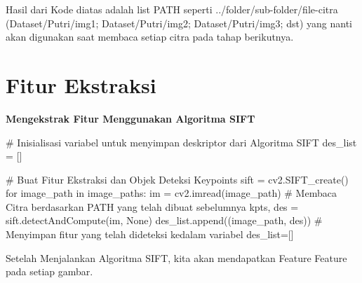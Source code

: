 \documentclass[
  letterpaper,
  DIV=11,
  numbers=noendperiod]{scrreprt}
\newenvironment{Shaded}{\begin{snugshade}}{\end{snugshade}}
\newcommand{\CommentTok}[1]{\textcolor[rgb]{0.37,0.37,0.37}{#1}}
\newcommand{\ControlFlowTok}[1]{\textcolor[rgb]{0.00,0.23,0.31}{#1}}
\newcommand{\KeywordTok}[1]{\textcolor[rgb]{0.00,0.23,0.31}{#1}}
\newcommand{\NormalTok}[1]{\textcolor[rgb]{0.00,0.23,0.31}{#1}}
\newcommand{\OperatorTok}[1]{\textcolor[rgb]{0.37,0.37,0.37}{#1}}
\newcommand{\VariableTok}[1]{\textcolor[rgb]{0.07,0.07,0.07}{#1}}
\begin{document}
\begin{tcolorbox}[enhanced jigsaw, opacityback=0, colbacktitle=quarto-callout-tip-color!10!white, breakable, titlerule=0mm, left=2mm, toptitle=1mm, rightrule=.15mm, leftrule=.75mm, colback=white, opacitybacktitle=0.6, arc=.35mm, toprule=.15mm, coltitle=black, colframe=quarto-callout-tip-color-frame, bottomtitle=1mm, title=\textcolor{quarto-callout-tip-color}{\faLightbulb}\hspace{0.5em}{Tip}, bottomrule=.15mm]

Hasil dari Kode diatas adalah list PATH seperti
../folder/sub-folder/file-citra (Dataset/Putri/img1; Dataset/Putri/img2;
Dataset/Putri/img3; dst) yang nanti akan digunakan saat membaca setiap
citra pada tahap berikutnya.

\end{tcolorbox}

\hypertarget{fitur-ekstraksi}{%
\section*{Fitur Ekstraksi}\label{fitur-ekstraksi}}


\textbf{Mengekstrak Fitur Menggunakan Algoritma SIFT}

\begin{Shaded}
\begin{Highlighting}[]
\CommentTok{\# Inisialisasi variabel untuk menyimpan deskriptor dari Algoritma SIFT}
\NormalTok{des\_list }\OperatorTok{=}\NormalTok{ []}

\CommentTok{\# Buat Fitur Ekstraksi dan Objek Deteksi Keypoints}
\NormalTok{sift }\OperatorTok{=}\NormalTok{ cv2.SIFT\_create()}
\ControlFlowTok{for}\NormalTok{ image\_path }\KeywordTok{in}\NormalTok{ image\_paths:}
\NormalTok{    im }\OperatorTok{=}\NormalTok{ cv2.imread(image\_path) }\CommentTok{\# Membaca Citra berdasarkan PATH yang telah dibuat sebelumnya}
\NormalTok{    kpts, des }\OperatorTok{=}\NormalTok{ sift.detectAndCompute(im, }\VariableTok{None}\NormalTok{)}
\NormalTok{    des\_list.append((image\_path, des))   }\CommentTok{\# Menyimpan fitur yang telah dideteksi kedalam variabel des\_list=[]}
\end{Highlighting}
\end{Shaded}

Setelah Menjalankan Algoritma SIFT, kita akan mendapatkan Feature
Feature pada setiap gambar.
\end{document}
